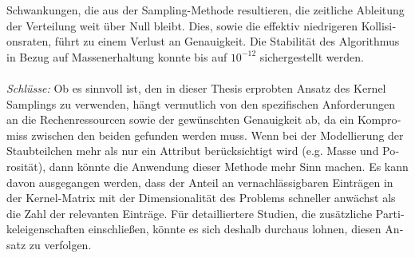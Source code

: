 \begin{otherlanguage}{german}
Schwankungen, die aus der Sampling-Methode resultieren, die zeitliche Ableitung der Verteilung weit 
über Null bleibt. Dies, sowie die effektiv niedrigeren Kollisionsraten, führt zu einem Verlust an 
Genauigkeit. Die Stabilität des Algorithmus in Bezug auf Massenerhaltung konnte bis auf $10^{-12}$ 
sichergestellt werden.
\\ \ \\
\textit{Schlüsse:}
Ob es sinnvoll ist, den in dieser Thesis erprobten Ansatz des Kernel Samplings zu verwenden, 
hängt vermutlich von den spezifischen Anforderungen an die Rechenressourcen sowie der gewünschten 
Genauigkeit ab, da ein Kompromiss zwischen den beiden gefunden werden muss. 
Wenn bei der Modellierung der Staubteilchen mehr als nur ein Attribut berücksichtigt wird 
(e.g. Masse und Porosität), dann könnte die Anwendung dieser Methode mehr Sinn machen.
Es kann davon ausgegangen werden, dass der Anteil an vernachlässigbaren Einträgen in der
Kernel-Matrix mit der Dimensionalität des Problems schneller anwächst als die Zahl der relevanten
Einträge. Für detailliertere Studien, die zusätzliche Partikeleigenschaften einschließen, 
könnte es sich deshalb durchaus lohnen, diesen Ansatz zu verfolgen.

\end{otherlanguage}
